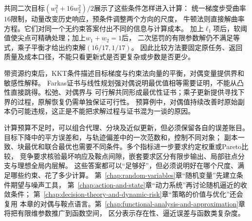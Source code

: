 共同二次目标$(w_1^2+16w_2^2)/2$展示了这些条件怎样进入计算：
统一梯度步受曲率$16$限制，动量改变历史响应，预条件调整两个方向的尺度，
牛顿法则直接解曲率方程。它们对同一个无约束答案付出不同的信息与计算成本。
加上$\ell_1$项后，软阈值使尖点可精确处理；加上$w_1+w_2=1$后，
二次惩罚的有限参数解仍不满足等式，乘子平衡才给出约束解$(16/17,1/17)$。
因此比较方法要固定原任务、返回质量及成本口径，不能只看更新式是否更复杂或步数是否更少。

带资源约束后，KKT条件描述目标梯度与约束法向量的平衡，对偶变量提供界和敏感性解释。
Farkas证书与线性规划强对偶说明最优值相等需要证明，不能从凸性直接跳得。松弛、对偶界与
可行解共同形成最优性证书；乘子更新提供寻找下界的过程，原解恢复仍需单独保证可行性。
预算例中，对偶值持续改善时原始副本仍可能违规，这正是不能把求解过程与证书混为一谈的原因。

计算预算不足时，可以组合代理、分块及近似更新，但必须保留各自的误差账目。
目标下降中的平方误差和，与轨迹偏差中的一次范数和，控制不同对象；
副本一致、块最优和联合最优也需要不同条件。多个指标进一步要求约定权重或Pareto比较，
竞争要求核验最坏响应及鞍点间隙，嵌套要求区分有限步输出、局部驻点分支与理想全局内层解。
这些答案都可以“足够好”，但必须说明好在哪个尺度、满足哪些约束、花了多少计算。
第~\ref{chap:random-variables}章“随机变量”先建立条件期望与噪声工具，
第~\ref{chap:action-and-state}章“动力系统”再讨论随机逼近的收敛条件；
第~\ref{chap:decision-theory-and-dynamic-risk}章“策略的价值与优化”还会复用
本章的对偶与鞍点语言。第~\ref{chap:functional-analysis-and-approximation}章将把有限维参数推广到函数空间，
区分表示存在性、逼近误差与函数类复杂度。
